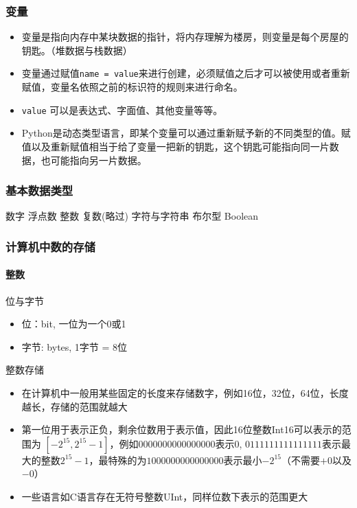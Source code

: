 \documentclass[10pt]{beamer}
\begin{document}
\begin{frame}
    \frametitle{变量}
    \begin{block}{}
        \begin{itemize}
            \item 变量是指向内存中某块数据的指针，将内存理解为楼房，则变量是每个房屋的钥匙。（堆数据与栈数据）
            \item 变量通过赋值\texttt{name = value}来进行创建，必须赋值之后才可以被使用或者重新赋值，变量名依照之前的标识符的规则来进行命名。
            \item \texttt{value} 可以是表达式、字面值、其他变量等等。
            \item Python是动态类型语言，即某个变量可以通过重新赋予新的不同类型的值。赋值以及重新赋值相当于给了变量一把新的钥匙，这个钥匙可能指向同一片数据，也可能指向另一片数据。
        \end{itemize}
    \end{block}

\end{frame}

\begin{frame}
\frametitle{基本数据类型}

\begin{outline}
    \1 数字
        \2 浮点数
        \2 整数
        \2 复数(略过)
    \1 字符与字符串
    \1 布尔型 Boolean
\end{outline}
\end{frame}

\begin{frame}
\frametitle{计算机中数的存储}
\framesubtitle{整数}
\begin{block}{位与字节}
    \begin{itemize}
        \item 位：bit, 一位为一个0或1
        \item 字节: bytes, 1字节 = 8位
    \end{itemize}
\end{block}

\begin{block}{整数存储}
\begin{itemize}
    \item 在计算机中一般用某些固定的长度来存储数字，例如16位，32位，64位，长度越长，存储的范围就越大
    \item 第一位用于表示正负，剩余位数用于表示值，因此16位整数Int16可以表示的范围为 $[-2^{15}, 2^{15}-1]$，例如$0000000000000000$表示$0$, $0111111111111111$表示最大的整数$2^{15}-1$，最特殊的为$1000000000000000$表示最小$-2^{15}$（不需要$+0$以及$-0$）
    \item 一些语言如C语言存在无符号整数UInt，同样位数下表示的范围更大
\end{itemize}
\end{block}

\end{frame}
\end{document}
